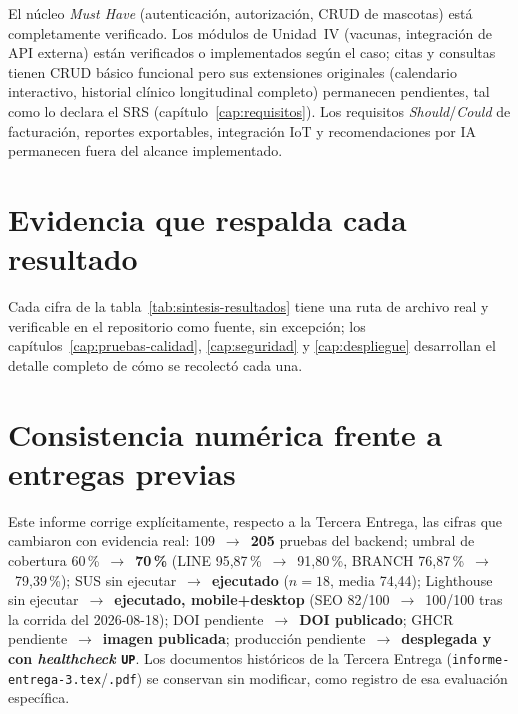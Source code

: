 El n\'ucleo \emph{Must Have} (autenticaci\'on, autorizaci\'on, CRUD de
mascotas) est\'a completamente verificado. Los m\'odulos de Unidad~IV
(vacunas, integraci\'on de API externa) est\'an verificados o
implementados seg\'un el caso; citas y consultas tienen CRUD b\'asico
funcional pero sus extensiones originales (calendario interactivo,
historial cl\'inico longitudinal completo) permanecen pendientes, tal como
lo declara el SRS (cap\'itulo~\ref{cap:requisitos}). Los requisitos
\emph{Should}/\emph{Could} de facturaci\'on, reportes exportables,
integraci\'on IoT y recomendaciones por IA permanecen fuera del alcance
implementado.

\section{Evidencia que respalda cada resultado}

Cada cifra de la tabla~\ref{tab:sintesis-resultados} tiene una ruta de
archivo real y verificable en el repositorio como fuente, sin excepci\'on;
los cap\'itulos~\ref{cap:pruebas-calidad}, \ref{cap:seguridad} y
\ref{cap:despliegue} desarrollan el detalle completo de c\'omo se
recolect\'o cada una.

\section{Consistencia num\'erica frente a entregas previas}

Este informe corrige expl\'icitamente, respecto a la Tercera Entrega,
las cifras que cambiaron con evidencia real: 109~$\to$~\textbf{205} pruebas
del backend; umbral de cobertura 60\,\%~$\to$~\textbf{70\,\%} (LINE
95{,}87\,\%~$\to$~91{,}80\,\%, BRANCH 76{,}87\,\%~$\to$~79{,}39\,\%); SUS
sin ejecutar~$\to$~\textbf{ejecutado} ($n=18$, media 74{,}44); Lighthouse
sin ejecutar~$\to$~\textbf{ejecutado, mobile+desktop} (SEO
82/100~$\to$~100/100 tras la corrida del 2026-08-18); DOI pendiente~$\to$~\textbf{DOI publicado}; GHCR
pendiente~$\to$~\textbf{imagen publicada}; producci\'on pendiente~$\to$~\textbf{desplegada
y con \emph{healthcheck} \texttt{UP}}. Los documentos hist\'oricos de la
Tercera Entrega (\texttt{informe-entrega-3.tex}/\texttt{.pdf}) se conservan
sin modificar, como registro de esa evaluaci\'on espec\'ifica.
